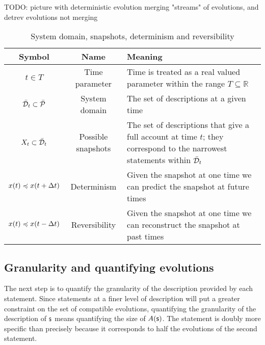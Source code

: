 \documentclass[letterpaper]{article}
\begin{document}
TODO: picture with deterministic evolution merging "streams" of evolutions, and detrev evolutions not merging

\begin{table}[h!]
	\centering
	\begin{tabular}[h]{|c|c|p{6cm}|}
		\hline 
		Symbol & Name & Meaning \\ 
		\hline 
		$t \in T$ & Time parameter & Time is treated as a real valued parameter within the range $T \subseteq \mathbb{R}$ \\ 
		\hline 
		$\tdomain_t \subset \tdomain[P]$ & System domain & The set of descriptions at a given time \\ 
		\hline 
		$X_t \subset \tdomain_t$ & Possible snapshots & The set of descriptions that give a full account at time $t$; they correspond to the narrowest statements within $\tdomain_t$ \\ 
		\hline 
		$x(t) \narrower x(t + \Delta t)$ & Determinism & Given the snapshot at one time we can predict the snapshot at future times \\ 
		\hline 
		$x(t) \narrower x(t - \Delta t)$ & Reversibility & Given the snapshot at one time we can reconstruct the snapshot at past times \\ 
		\hline 
	\end{tabular} 
	\caption{System domain, snapshots, determinism and reversibility}
	\label{table:states}
\end{table}

\subsection{Granularity and quantifying evolutions}

The next step is to quantify the granularity of the description provided by each statement. Since statements at a finer level of description will put a greater constraint on the set of compatible evolutions, quantifying the granularity of the description of $\stmt$ means quantifying the size of $A(\stmt)$. The statement  is doubly more specific than  precisely because it corresponds to half the evolutions of the second statement.
\end{document}
